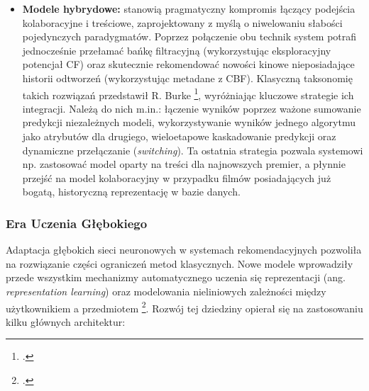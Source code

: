 \begin{itemize}
    \item \textbf{Modele hybrydowe:} stanowią pragmatyczny kompromis łączący podejścia kolaboracyjne i treściowe, zaprojektowany z myślą o niwelowaniu słabości pojedynczych paradygmatów. Poprzez połączenie obu technik system potrafi jednocześnie przełamać bańkę filtracyjną (wykorzystując eksploracyjny potencjał CF) oraz skutecznie rekomendować nowości kinowe nieposiadające historii odtworzeń (wykorzystując metadane z CBF). Klasyczną taksonomię takich rozwiązań przedstawił R. Burke \footcite{burkeHybridRecommenderSystems2002}, wyróżniając kluczowe strategie ich integracji. Należą do nich m.in.: łączenie wyników poprzez ważone sumowanie predykcji niezależnych modeli, wykorzystywanie wyników jednego algorytmu jako atrybutów dla drugiego, wieloetapowe kaskadowanie predykcji oraz dynamiczne przełączanie (\foreignlanguage{english}{\textit{switching}}). Ta ostatnia strategia pozwala systemowi np. zastosować model oparty na treści dla najnowszych premier, a płynnie przejść na model kolaboracyjny w przypadku filmów posiadających już bogatą, historyczną reprezentację w bazie danych.
\end{itemize}

\subsubsection{Era Uczenia Głębokiego}

Adaptacja głębokich sieci neuronowych w systemach rekomendacyjnych pozwoliła na rozwiązanie części ograniczeń metod klasycznych. Nowe modele wprowadziły przede wszystkim mechanizmy automatycznego uczenia się reprezentacji (ang. \foreignlanguage{english}{\textit{representation learning}}) oraz modelowania nieliniowych zależności między użytkownikiem a przedmiotem \footcite{zhangDeepLearningBased2020}. Rozwój tej dziedziny opierał się na zastosowaniu kilku głównych architektur:


